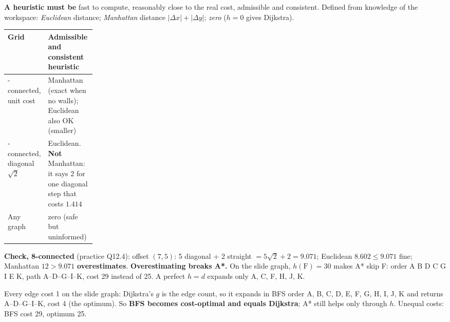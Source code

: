 \begin{multicols}{2}
\textbf{A heuristic must be}  fast to compute, reasonably close to the real cost, admissible and consistent. Defined from knowledge of the workspace: \emph{Euclidean} distance; \emph{Manhattan} distance $|\Delta x|+|\Delta y|$; \emph{zero} ($h=0$ gives Dijkstra).
\begin{tabularx}{\linewidth}{@{}>{\raggedright\arraybackslash}p{0.2\linewidth}>{\raggedright\arraybackslash}X@{}}\toprule
Grid & Admissible and consistent heuristic\\\midrule
4-connected, unit cost & Manhattan (exact when no walls); Euclidean also OK (smaller)\\
8-connected, diagonal $\sqrt2$ & Euclidean. \textbf{Not} Manhattan: it says 2 for one diagonal step that costs $1.414$\\
Any graph & zero (safe but uninformed)\\\bottomrule
\end{tabularx}
\textbf{Check, 8-connected} (practice Q12.4): offset $(7,5)$: 5 diagonal + 2 straight $=5\sqrt2+2=9.071$; Euclidean $8.602\le9.071$ fine; Manhattan $12>9.071$ \textbf{overestimates}. \chk
{}
\textbf{Overestimating breaks A*.} On the slide graph, $h(\text{F})=30$ makes A* skip F: order A B D C G I E K, path A--D--G--I--K, cost 29 instead of 25. A perfect $h=d$ expands only A, C, F, H, J, K. \chk
\begin{worked}\label{w12:equal}
Every edge cost 1 on the slide graph: Dijkstra's $g$ is the edge count, so it expands in BFS order A, B, C, D, E, F, G, H, I, J, K and returns A--D--G--I--K, cost 4 (the optimum). So \textbf{BFS becomes cost-optimal and equals Dijkstra}; A* still helps only through $h$. Unequal costs: BFS cost 29, optimum 25. \chk
\end{worked}


\end{multicols}
